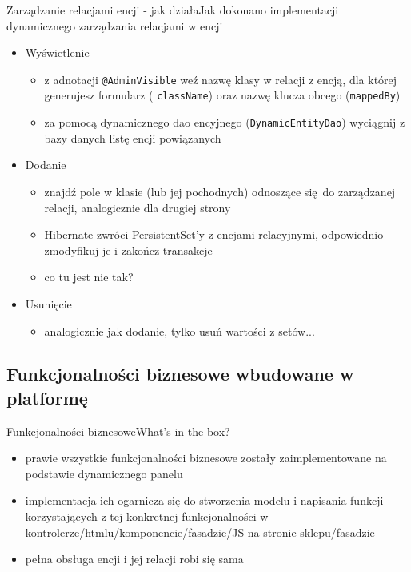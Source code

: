 \documentclass[polish,xcolor=table,9pt,aspectratio=1610,hyperref={pdfpagemode=FullScreen}]{beamer}
\begin{document}
\begin{frame}{Zarządzanie relacjami encji - jak działa}{Jak dokonano implementacji dynamicznego zarządzania relacjami w encji}
\begin{itemize}
	\item<1-> Wyświetlenie 
	\begin{itemize}
		\item<2-> z adnotacji \texttt{@AdminVisible} weź nazwę klasy w relacji z encją, dla której generujesz formularz ( \texttt{className}) oraz nazwę klucza obcego (\texttt{mappedBy})
		\item<2-> za pomocą dynamicznego dao encyjnego (\texttt{DynamicEntityDao}) wyciągnij z bazy danych listę encji powiązanych
	\end{itemize}
	\item<1-> Dodanie 
	\begin{itemize}
		\item<3-> znajdź pole w klasie (lub jej pochodnych) odnoszące się do zarządzanej relacji, analogicznie dla drugiej strony
		\item<3-> Hibernate zwróci PersistentSet'y z encjami relacyjnymi, odpowiednio zmodyfikuj je i zakończ transakcje
		\item<3-> co tu jest nie tak?
	\end{itemize}
	\item<1-> Usunięcie
		\begin{itemize}
			\item<4-> analogicznie jak dodanie, tylko usuń wartości z setów...
		\end{itemize}
\end{itemize}
\end{frame}

\subsection{Funkcjonalności biznesowe wbudowane w platformę}

\begin{frame}{Funkcjonalności biznesowe}{What's in the box?}
\begin{itemize}
	\item<1-> prawie wszystkie funkcjonalności biznesowe zostały zaimplementowane na podstawie dynamicznego panelu
	\item<2-> implementacja ich ogarnicza się do stworzenia modelu i napisania funkcji korzystających z tej konkretnej funkcjonalności w kontrolerze/htmlu/komponencie/fasadzie/JS na stronie sklepu/fasadzie
	\item<3-> pełna obsługa encji i jej relacji robi się sama
\end{itemize}
\end{frame}
\end{document}
